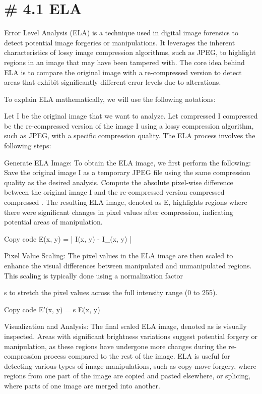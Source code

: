 \documentclass[
  11pt,
]{article}
\begin{document}
\hypertarget{ela}{%
\section{\# 4.1 ELA}\label{ela}}

Error Level Analysis (ELA) is a technique used in digital image
forensics to detect potential image forgeries or manipulations. It
leverages the inherent characteristics of lossy image compression
algorithms, such as JPEG, to highlight regions in an image that may have
been tampered with. The core idea behind ELA is to compare the original
image with a re-compressed version to detect areas that exhibit
significantly different error levels due to alterations.

To explain ELA mathematically, we will use the following notations:

Let I be the original image that we want to analyze. Let compressed I
compressed be the re-compressed version of the image I using a lossy
compression algorithm, such as JPEG, with a specific compression
quality. The ELA process involves the following steps:

Generate ELA Image: To obtain the ELA image, we first perform the
following: Save the original image I as a temporary JPEG file using the
same compression quality as the desired analysis. Compute the absolute
pixel-wise difference between the original image I and the re-compressed
version compressed compressed . The resulting ELA image, denoted as E,
highlights regions where there were significant changes in pixel values
after compression, indicating potential areas of manipulation.

Copy code
E(x, y) = \left | I(x, y) - I_{}(x, y) \right |

Pixel Value Scaling: The pixel values in the ELA image are then scaled
to enhance the visual differences between manipulated and unmanipulated
regions. This scaling is typically done using a normalization factor

s to stretch the pixel values across the full intensity range (0 to
255).

Copy code
E'(x, y) = s \times E(x, y)

Visualization and Analysis: The final scaled ELA image, denoted as is
visually inspected. Areas with significant brightness variations suggest
potential forgery or manipulation, as these regions have undergone more
changes during the re-compression process compared to the rest of the
image. ELA is useful for detecting various types of image manipulations,
such as copy-move forgery, where regions from one part of the image are
copied and pasted elsewhere, or splicing, where parts of one image are
merged into another.
\end{document}
